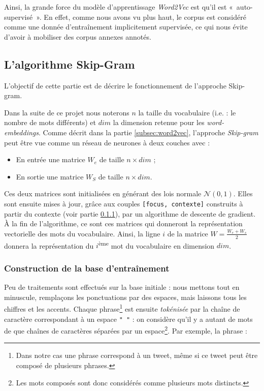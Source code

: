 \documentclass[11pt,french,french]{article}
\let\rmarkdownfootnote\footnote%
\def\footnote{\protect\rmarkdownfootnote}
\begin{document}
Ainsi, la grande force du modèle d'apprentissage \emph{Word2Vec} est
qu'il est «~auto-supervisé~». En effet, comme nous avons vu plus haut,
le corpus est considéré comme une donnée d'entraînement implicitement
supervisée, ce qui nous évite d'avoir à mobiliser des corpus annexes
annotés.

\subsection{L'algorithme Skip-Gram}\label{sec:skipgram}

L'objectif de cette partie est de décrire le fonctionnement de
l'approche Skip-gram.

Dans la suite de ce projet nous noterons \(n\) la taille du vocabulaire
(i.e. : le nombre de mots différents) et \(dim\) la dimension retenue
pour les \emph{word-embeddings}. Comme décrit dans la partie
\ref{subsec:word2vec}, l'approche \emph{Skip-gram} peut être vue comme
un réseau de neurones à deux couches avec :

\begin{itemize}
\item
  En entrée une matrice \(W_e\) de taille \(n\times dim\) ;
\item
  En sortie une matrice \(W_S\) de taille \(n\times dim\).
\end{itemize}

Ces deux matrices sont initialisées en générant des lois normale
\(\mathcal N(0,1)\). Elles sont ensuite mises à jour, grâce aux couples
\texttt{{[}focus,\ contexte{]}} construits à partir du contexte (voir
partie \ref{subsec:baseentrainement}), par un algorithme de descente de
gradient. À la fin de l'algorithme, ce sont ces matrices qui donneront
la représentation vectorielle des mots du vocabulaire. Ainsi, la ligne
\(i\) de la matrice \(W=\frac{W_e+W_s}{2}\) donnera la représentation du
\(i\)\textsuperscript{ème} mot du vocabulaire en dimension \(dim\).

\subsubsection{Construction de la base
d'entraînement}\label{subsec:baseentrainement}

Peu de traitements sont effectués sur la base initiale : nous mettons
tout en minuscule, remplaçons les ponctuations par des espaces, mais
laissons tous les chiffres et les accents. Chaque phrase\footnote{Dans
  notre cas une phrase correspond à un tweet, même si ce tweet peut être
  composé de plusieurs phrases.} est ensuite \emph{tokénisée} par la
chaîne de caractère correspondant à un espace \texttt{"\ "} : on
considère qu'il y a autant de mots de que chaînes de caractères séparées
par un espace\footnote{Les mots composés sont donc considérés comme
  plusieurs mots distincts.}. Par exemple, la phrase :
\end{document}
